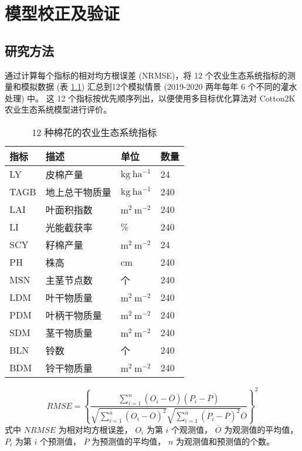 \chapter{模型校正及验证}\label{chap:moo}

\section{研究方法}

通过计算每个指标的相对均方根误差 (NRMSE)，将 12 个农业生态系统指标的测量和模拟数据 (表 \ref{tab:metrics}) 汇总到12个模拟情景 (2019-2020 两年每年 6 个不同的灌水处理) 中。%
这 12 个指标按优先顺序列出，以便使用多目标优化算法对 Cotton2K 农业生态系统模型进行评价。

\begin{table}
    \caption{12 种棉花的农业生态系统指标}\label{tab:metrics}
    \centering
    \begin{tabular}{llll}
        \toprule
        指标 & 描述           & 单位                   & 数量 \\
        \midrule
        LY   & 皮棉产量       & $\mathrm{kg\ ha^{-1}}$ & 24   \\
        TAGB & 地上总干物质量 & $\mathrm{kg\ ha^{-1}}$ & 240  \\
        LAI  & 叶面积指数     & $\mathrm{m^2\ m^{-2}}$ & 240  \\
        LI   & 光能截获率     & \%                     & 240  \\
        SCY  & 籽棉产量       & $\mathrm{m^2\ m^{-2}}$ & 24   \\
        PH   & 株高           & cm                     & 240  \\
        MSN  & 主茎节点数     & 个                     & 240  \\
        LDM  & 叶干物质量     & $\mathrm{m^2\ m^{-2}}$ & 240  \\
        PDM  & 叶柄干物质量   & $\mathrm{m^2\ m^{-2}}$ & 240  \\
        SDM  & 茎干物质量     & $\mathrm{m^2\ m^{-2}}$ & 240  \\
        BLN  & 铃数           & 个                     & 240  \\
        BDM  & 铃干物质量     & $\mathrm{m^2\ m^{-2}}$ & 240  \\
        \bottomrule
    \end{tabular}
\end{table}

\begin{equation}\label{eq:NRMSE}
    RMSE = \left \{ \frac{\sum_{i=1}^n (O_i - \overline{O}) (P_i - \overline{P})}{\sqrt{\sum_{i=1}^n (O_i - \overline{O})^2} \sqrt{\sum_{i=1}^n (P_i - \overline{P})^2} \overline{O}} \right \}^2
\end{equation}
式中 $NRMSE$ 为相对均方根误差， $O_i$ 为第 $i$ 个观测值， $\overline{O}$ 为观测值的平均值， $P_i$ 为第 $i$ 个预测值， $\overline{P}$ 为预测值的平均值， $n$ 为观测值和预测值的个数。

